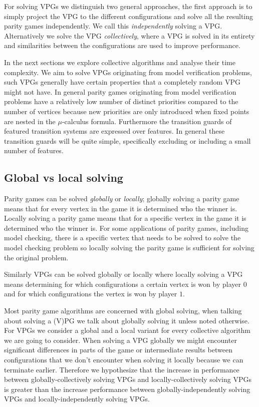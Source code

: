 For solving VPGs we distinguish two general approaches, the first approach is to simply project the VPG to the different configurations and solve all the resulting parity games independently. We call this \textit{independently} solving a VPG. Alternatively we solve the VPG \textit{collectively}, where a VPG is solved in its entirety and similarities between the configurations are used to improve performance. 

In the next sections we explore collective algorithms and analyse their time complexity. We aim to solve VPGs originating from model verification problems, such VPGs generally have certain properties that a completely random VPG might not have. In general parity games originating from model verification problems have a relatively low number of distinct priorities compared to the number of vertices because new priorities are only introduced when fixed points are nested in the $\mu$-calculus formula. Furthermore the transition guards of featured transition systems are expressed over features. In general these transition guards will be quite simple, specifically excluding or including a small number of features.

\subsection{Global vs local solving}
Parity games can be solved \textit{globally} or \textit{locally}; globally solving a parity game means that for every vertex in the game it is determined who the winner is. Locally solving a parity game means that for a specific vertex in the game it is determined who the winner is. For some applications of parity games, including model checking, there is a specific vertex that needs to be solved to solve the model checking problem so locally solving the parity game is sufficient for solving the original problem.

Similarly VPGs can be solved globally or locally where locally solving a VPG means determining for which configurations a certain vertex is won by player $0$ and for which configurations the vertex is won by player $1$.

Most parity game algorithms are concerned with global solving, when talking about solving a (V)PG we talk about globally solving it unless noted otherwise. For VPGs we consider a global and a local variant for every collective algorithm we are going to consider. When solving a VPG globally we might encounter significant differences in parts of the game or intermediate results between configurations that we don't encounter when solving it locally because we can terminate earlier. Therefore we hypothesize that the increase in performance between globally-collectively solving VPGs and locally-collectively solving VPGs is greater than the increase performance between globally-independently solving VPGs and locally-independently solving VPGs.